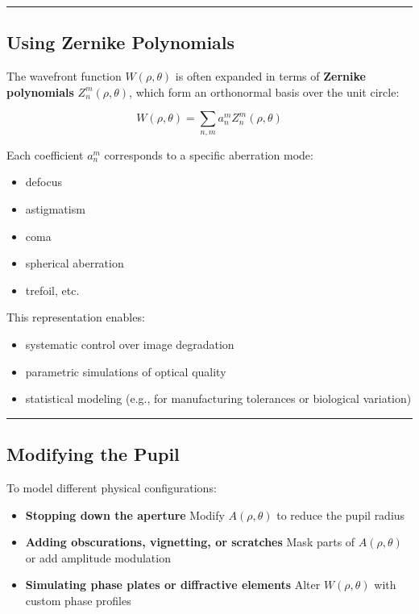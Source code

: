 \documentclass[
  letterpaper,
]{book}
\providecommand{\tightlist}{%
  \setlength{\itemsep}{0pt}\setlength{\parskip}{0pt}}\usepackage{longtable,booktabs,array}
\begin{document}
\begin{center}\rule{0.5\linewidth}{0.5pt}\end{center}

\subsection{Using Zernike Polynomials}\label{using-zernike-polynomials}

The wavefront function \(W(\rho, \theta)\) is often expanded in terms of
\textbf{Zernike polynomials} \(Z_n^m(\rho, \theta)\), which form an
orthonormal basis over the unit circle:

\[
W(\rho, \theta) = \sum_{n,m} a_n^m Z_n^m(\rho, \theta)
\]

Each coefficient \(a_n^m\) corresponds to a specific aberration mode:

\begin{itemize}
\tightlist
\item
  defocus
\item
  astigmatism
\item
  coma
\item
  spherical aberration
\item
  trefoil, etc.
\end{itemize}

This representation enables:

\begin{itemize}
\tightlist
\item
  systematic control over image degradation
\item
  parametric simulations of optical quality
\item
  statistical modeling (e.g., for manufacturing tolerances or biological
  variation)
\end{itemize}

\begin{center}\rule{0.5\linewidth}{0.5pt}\end{center}

\subsection{Modifying the Pupil}\label{modifying-the-pupil}

To model different physical configurations:

\begin{itemize}
\tightlist
\item
  \textbf{Stopping down the aperture} Modify \(A(\rho, \theta)\) to
  reduce the pupil radius
\item
  \textbf{Adding obscurations, vignetting, or scratches} Mask parts of
  \(A(\rho, \theta)\) or add amplitude modulation
\item
  \textbf{Simulating phase plates or diffractive elements} Alter
  \(W(\rho, \theta)\) with custom phase profiles
\end{itemize}
\end{document}
